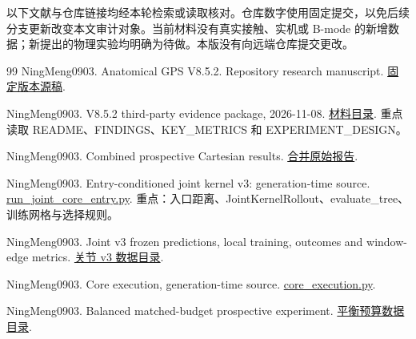 \documentclass[11pt,a4paper,fontset=fandol]{ctexart}
\theoremstyle{definition}
\theoremstyle{remark}\newtheorem{remark}[theorem]{说明}
\numberwithin{equation}{section}
\begin{document}
以下文献与仓库链接均经本轮检索或读取核对。仓库数字使用固定提交，以免后续分支更新改变本文审计对象。当前材料没有真实接触、实机或 B-mode 的新增数据；新提出的物理实验均明确为待做。本版没有向远端仓库提交更改。

\begin{thebibliography}{99}
NingMeng0903. Anatomical GPS V8.5.2. Repository research manuscript.
\href{https://github.com/NingMeng0903/RealUS_playground/blob/190e9e3cec96f2a467884b545e465364cfc76501/NMI_idea/ideas/Anatomical_GPS_V8.5.2.tex}{固定版本源稿}.

NingMeng0903. V8.5.2 third-party evidence package, 2026-11-08.
\href{https://github.com/NingMeng0903/RealUS_playground/tree/190e9e3cec96f2a467884b545e465364cfc76501/NMI_idea/experiments/v852/2026-11-08/third_party_review}{材料目录}.
重点读取 README、FINDINGS、KEY\_METRICS 和 EXPERIMENT\_DESIGN。

NingMeng0903. Combined prospective Cartesian results.
\href{https://github.com/NingMeng0903/RealUS_playground/blob/190e9e3cec96f2a467884b545e465364cfc76501/NMI_idea/experiments/v852/2026-11-08/third_party_review/reports/combined/RESULTS.txt}{合并原始报告}.

NingMeng0903. Entry-conditioned joint kernel v3: generation-time source.
\href{https://github.com/NingMeng0903/RealUS_playground/blob/190e9e3cec96f2a467884b545e465364cfc76501/NMI_idea/experiments/v852/2026-11-08/third_party_review/data/v852_joint_core_20261108/entry_conditioned_v3/source_snapshot/run_joint_core_entry.py}{run\_joint\_core\_entry.py}.
重点：入口距离、JointKernelRollout、evaluate\_tree、训练网格与选择规则。

NingMeng0903. Joint v3 frozen predictions, local training, outcomes and window-edge metrics.
\href{https://github.com/NingMeng0903/RealUS_playground/tree/190e9e3cec96f2a467884b545e465364cfc76501/NMI_idea/experiments/v852/2026-11-08/third_party_review/data/v852_joint_core_20261108/entry_conditioned_v3}{关节 v3 数据目录}.

NingMeng0903. Core execution, generation-time source.
\href{https://github.com/NingMeng0903/RealUS_playground/blob/190e9e3cec96f2a467884b545e465364cfc76501/NMI_idea/experiments/v852/2026-11-08/third_party_review/data/v852_core_suite_20261108/source_snapshot/core_execution.py}{core\_execution.py}.

NingMeng0903. Balanced matched-budget prospective experiment.
\href{https://github.com/NingMeng0903/RealUS_playground/tree/190e9e3cec96f2a467884b545e465364cfc76501/NMI_idea/experiments/v852/2026-11-08/third_party_review/data/v852_matched_budget_balanced_20261108}{平衡预算数据目录}.


\end{thebibliography}
\end{document}
